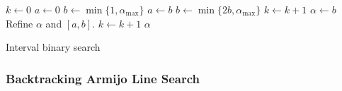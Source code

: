 \documentclass[10pt]{article}
\begin{document}
\begin{itemize}
    \begin{algorithm}[t]
    \begin{algorithmic}
        \State $k \gets 0$
        \State $a \gets 0$
        \State $b \gets \min\{1, \alpha_{\max}\}$
            \State $a \gets b$
            \State $b \gets \min\{2b, \alpha_{\max}\}$
            \State $k \gets k+1$            
        \EndWhile
        \State $\alpha \gets b$
            \State Refine $\alpha$ and $[a,b]$.
            \State $k \gets k+1$
        \EndWhile
        \State \Return $\alpha$
    \end{algorithmic}
    \caption{Interval binary search}
    \label{algo:interval-binary-search}
    \end{algorithm}
\end{itemize}

\subsubsection{Backtracking Armijo Line Search}
\end{document}
